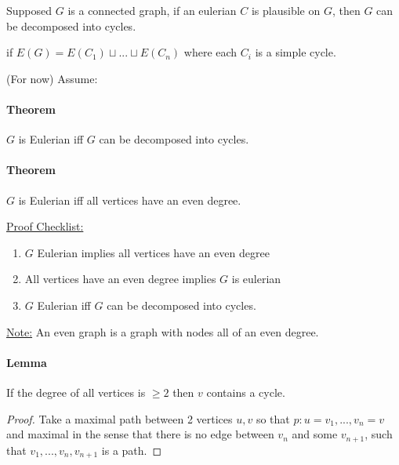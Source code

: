 \documentclass[12pt]{article}
\begin{document}
Supposed $G$ is a connected graph, if an eulerian $C$ is plausible on $G$, then $G$ can be decomposed into cycles.

\begin{tcolorbox}[title=Definition: $G$ can be decomposed into cycles]
	if $E(G) = E(C_1) \sqcup ... \sqcup E(C_n)$ where each $C_i$ is a simple cycle.
\end{tcolorbox}

(For now) Assume:\\ 
\paragraph{Theorem} $G$ is Eulerian iff $G$ can be decomposed into cycles.
\paragraph{Theorem} $G$ is Eulerian iff all vertices have an even degree.

\underline{Proof Checklist:}
\begin{enumerate}
	\item{$G$ Eulerian implies all vertices have an even degree}
	\item{All vertices have an even degree implies $G$ is eulerian}
	\item{$G$ Eulerian iff  $G$ can be decomposed into cycles.}
\end{enumerate}

\begin{tcolorbox}
	\underline{Note:} An even graph is a graph with nodes all of an even degree.
\end{tcolorbox}

\paragraph{Lemma} If the degree of all vertices is $\geq 2$ then $v$ contains a cycle.
\begin{proof}
	Take a maximal path between 2 vertices $u,v$ so that $p: u=v_1,...,v_n=v$ and maximal in the sense that there is no edge between $v_n$ and some $v_{n+1}$, such that $v_1,...,v_n, v_{n+1}$ is a path.
\end{proof}
\end{document}
